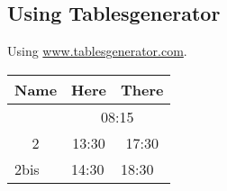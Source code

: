 \documentclass[10pt,a4paper]{article}
\begin{document}
\subsection{Using Tablesgenerator}

Using \url{www.tablesgenerator.com}.

\begin{tabular}{@{}ccc@{}}
    \toprule
    \cellcolor[HTML]{6665CD}Name                    & \cellcolor[HTML]{6665CD}Here                       & There                      \\ \midrule
    \rowcolor[HTML]{6665CD}
    \multicolumn{1}{|c|}{\cellcolor[HTML]{6665CD}1} & \multicolumn{2}{c|}{\cellcolor[HTML]{6665CD}08:15}                              \\ \midrule
    \multicolumn{1}{|c|}{2}                         & \multicolumn{1}{c|}{13:30}                         & \multicolumn{1}{c|}{17:30} \\ \midrule
    \multicolumn{1}{l}{2bis}                        & \multicolumn{1}{l}{14:30}                          & \multicolumn{1}{l}{18:30}  \\ \bottomrule
\end{tabular}
\end{document}
